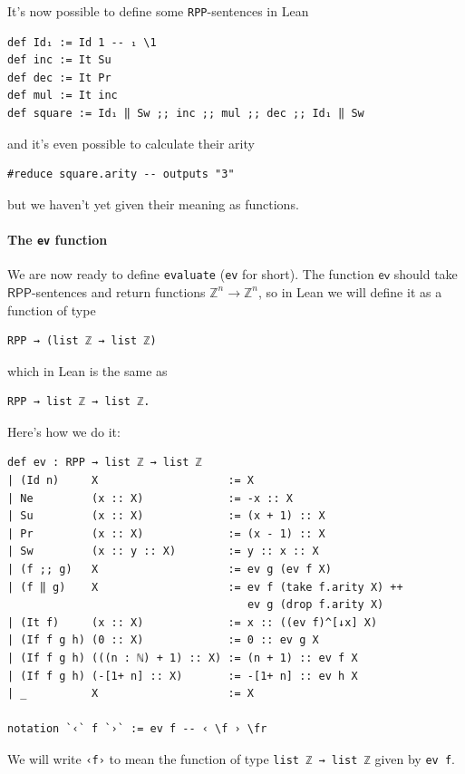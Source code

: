 \documentclass{book}
\theoremstyle{definition}
\theoremstyle{remark}
\theoremstyle{plain}
\newcommand{\ZZ}{\mathbb{Z}}
\newcommand{\RPP}{\mathsf{RPP}}
\begin{document}
It's now possible to define some \lstinline{RPP}-sentences in Lean
\begin{lstlisting}
def Id₁ := Id 1 -- ₁ \1
def inc := It Su
def dec := It Pr
def mul := It inc
def square := Id₁ ‖ Sw ;; inc ;; mul ;; dec ;; Id₁ ‖ Sw
\end{lstlisting}
and it's even possible to calculate their arity
\begin{lstlisting}
#reduce square.arity -- outputs "3"
\end{lstlisting}
but we haven't yet given their meaning as functions.

\paragraph{The \lstinline{ev} function}
We are now ready to define \lstinline{evaluate} (\lstinline{ev} for short).
The function $\mathsf{ev}$ should take $\RPP$-sentences and return functions $\ZZ^n \to \ZZ^n$,
so in Lean we will define it as a function of type
\begin{lstlisting}
RPP → (list ℤ → list ℤ)
\end{lstlisting}
which in Lean is the same as
\begin{lstlisting}
RPP → list ℤ → list ℤ.
\end{lstlisting}
Here's how we do it:
\begin{lstlisting}
def ev : RPP → list ℤ → list ℤ
| (Id n)     X                    := X
| Ne         (x :: X)             := -x :: X
| Su         (x :: X)             := (x + 1) :: X
| Pr         (x :: X)             := (x - 1) :: X
| Sw         (x :: y :: X)        := y :: x :: X
| (f ;; g)   X                    := ev g (ev f X)
| (f ‖ g)    X                    := ev f (take f.arity X) ++
                                     ev g (drop f.arity X)
| (It f)     (x :: X)             := x :: ((ev f)^[↓x] X)
| (If f g h) (0 :: X)             := 0 :: ev g X
| (If f g h) (((n : ℕ) + 1) :: X) := (n + 1) :: ev f X
| (If f g h) (-[1+ n] :: X)       := -[1+ n] :: ev h X
| _          X                    := X

notation `‹` f `›` := ev f -- ‹ \f › \fr
\end{lstlisting}
We will write \lstinline{‹f›} to mean the function of type \lstinline{list ℤ → list ℤ} given by \lstinline{ev f}.
\end{document}
